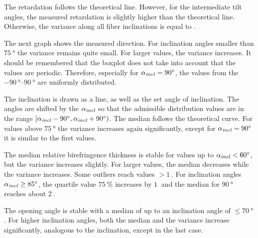 The retardation follows the theoretical line.
However, for the intermediate tilt angles, the measured retardation is slightly higher than the theoretical line.
Otherwise, the variance along all fiber inclinations is equal to \modelInc{}.
\par
%
The next graph shows the measured direction.
For inclination angles smaller than $\SI{75}{\degree}$ the variance remains quite small.
For larger values, the variance increases.
It should be remembered that the boxplot does not take into account that the values are periodic.
Therefore, especially for $\textnormal{$\alpha_{\mathit{incl}}$}=\SI{90}{\degree}$, the values from the $\SIrange{-90}{90}{\degree}$ are uniformly distributed.
\par
%
The inclination is drawn as a line, as well as the set angle of inclination.
The angles are shifted by the $\textnormal{$\alpha_{\mathit{incl}}$}$ so that the admissible distribution values are in the range $[\textnormal{$\alpha_{\mathit{incl}}$}-\SI{90}{\degree}, \textnormal{$\alpha_{\mathit{incl}}$}+\SI{90}{\degree})$.
The median follows the theoretical curve.
For values above $\SI{75}{\degree}$ the variance increases again significantly, except for $\textnormal{$\alpha_{\mathit{incl}}$} = \SI{90}{\degree}$ it is similar to the first values.
\par
%
The median relative birefringence thickness \trel{} is stable for values up to $\textnormal{$\alpha_{\mathit{incl}}$} < \SI{60}{\degree}$, but the variance increases slightly.
For larger values, the median decreases while the variance increases.
Some outliers reach values $>\SI{1}{}$.
For inclination angles $\textnormal{$\alpha_{\mathit{incl}}$} \ge \SI{85}{\degree}$, the quartile value $\SI{75}{\percent}$ increases by $\SI{1}{}$ and the median for $\SI{90}{\degree}$ reaches about $\SI{2}{}$.
\par
%
The opening angle \openingAngle{} is stable with a median of \dummy{} up to an inclination angle of $\le \SI{70}{\degree}$.
For higher inclination angles, both the median and the variance increase significantly, analogous to the inclination, except in the last case.
%
%
%
